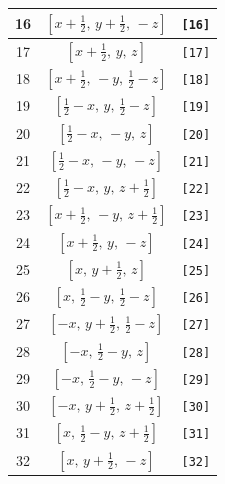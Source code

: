 \documentclass[fleqn,8pt]{jsarticle}
\begin{document}
\begin{longtable}{ccc}
16 & $\left[ x + \frac{1}{2},\, y + \frac{1}{2},\, - z \right]$ & {\tt [16]} \\ \hline
17 & $\left[ x + \frac{1}{2},\, y,\, z \right]$ & {\tt [17]} \\ \hline
18 & $\left[ x + \frac{1}{2},\, - y,\, \frac{1}{2} - z \right]$ & {\tt [18]} \\ \hline
19 & $\left[ \frac{1}{2} - x,\, y,\, \frac{1}{2} - z \right]$ & {\tt [19]} \\ \hline
20 & $\left[ \frac{1}{2} - x,\, - y,\, z \right]$ & {\tt [20]} \\ \hline
21 & $\left[ \frac{1}{2} - x,\, - y,\, - z \right]$ & {\tt [21]} \\ \hline
22 & $\left[ \frac{1}{2} - x,\, y,\, z + \frac{1}{2} \right]$ & {\tt [22]} \\ \hline
23 & $\left[ x + \frac{1}{2},\, - y,\, z + \frac{1}{2} \right]$ & {\tt [23]} \\ \hline
24 & $\left[ x + \frac{1}{2},\, y,\, - z \right]$ & {\tt [24]} \\ \hline
25 & $\left[ x,\, y + \frac{1}{2},\, z \right]$ & {\tt [25]} \\ \hline
26 & $\left[ x,\, \frac{1}{2} - y,\, \frac{1}{2} - z \right]$ & {\tt [26]} \\ \hline
27 & $\left[ - x,\, y + \frac{1}{2},\, \frac{1}{2} - z \right]$ & {\tt [27]} \\ \hline
28 & $\left[ - x,\, \frac{1}{2} - y,\, z \right]$ & {\tt [28]} \\ \hline
29 & $\left[ - x,\, \frac{1}{2} - y,\, - z \right]$ & {\tt [29]} \\ \hline
30 & $\left[ - x,\, y + \frac{1}{2},\, z + \frac{1}{2} \right]$ & {\tt [30]} \\ \hline
31 & $\left[ x,\, \frac{1}{2} - y,\, z + \frac{1}{2} \right]$ & {\tt [31]} \\ \hline
32 & $\left[ x,\, y + \frac{1}{2},\, - z \right]$ & {\tt [32]} \\
\end{longtable}
\end{document}
